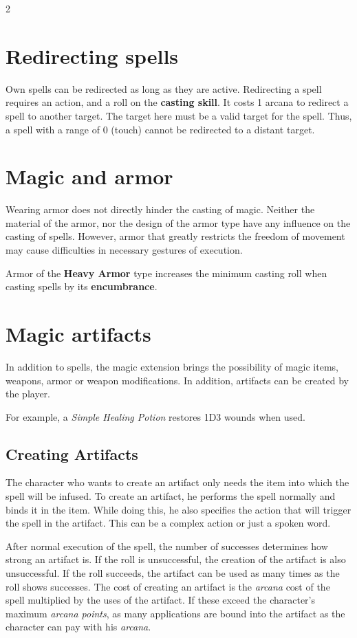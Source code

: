 \begin{multicols}{2}
\section{Redirecting spells}

Own spells can be redirected as long as they are active. Redirecting a spell requires an action, and a roll on the \textbf{casting skill}. It costs 1 arcana to redirect a spell to another target. The target here must be a valid target for the spell. Thus, a spell with a range of 0 (touch) cannot be redirected to a distant target.

\section{Magic and armor}

Wearing armor does not directly hinder the casting of magic. Neither the material of the armor, nor the design of the armor type have any influence on the casting of spells. However, armor that greatly restricts the freedom of movement may cause difficulties in necessary gestures of execution.

Armor of the \textbf{Heavy Armor} type increases the minimum casting roll when casting spells by its \textbf{encumbrance}.

\section{Magic artifacts}

In addition to spells, the magic extension brings the possibility of magic items, weapons, armor or weapon modifications. In addition, artifacts can be created by the player.

For example, a \textit{Simple Healing Potion} restores 1D3 wounds when used.

\subsection{Creating Artifacts}

The character who wants to create an artifact only needs the item into which the spell will be infused. To create an artifact, he performs the spell normally and binds it in the item. While doing this, he also specifies the action that will trigger the spell in the artifact. This can be a complex action or just a spoken word.

After normal execution of the spell, the number of successes determines how strong an artifact is. If the roll is unsuccessful, the creation of the artifact is also unsuccessful. If the roll succeeds, the artifact can be used as many times as the roll shows successes. The cost of creating an artifact is the \textit{arcana} cost of the spell multiplied by the uses of the artifact. If these exceed the character's maximum \textit{arcana points}, as many applications are bound into the artifact as the character can pay with his \textit{arcana}.


\end{multicols}
